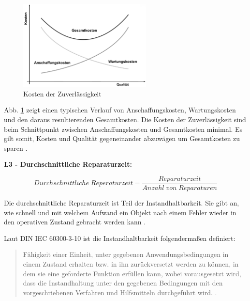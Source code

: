 \begin{figure}[h!]
	\centering
	\includegraphics[width=0.6\textwidth]{BilderAllgemein/kosten_der_zuverlaessigkeit.PNG}
	\caption{Kosten der Zuverlässigkeit \cite{Eberlin14}}
	\label{img:kosten_der_zuverlaessigkeit}
\end{figure}

Abb. \ref{img:kosten_der_zuverlaessigkeit} zeigt einen typischen Verlauf von Anschaffungskosten, Wartungskosten und den daraus resultierenden Gesamtkosten. Die Kosten der Zuverlässigkeit sind beim Schnittpunkt zwischen Anschaffungskosten und Gesamtkosten minimal. Es gilt somit, Kosten und Qualität gegeneinander abzuwägen um Gesamtkosten zu sparen \cite{Eberlin14}.

\textbf{L3 - Durchschnittliche Reparaturzeit:}

$$Durchschnittliche\;Reperaturzeit = \frac{Reparaturzeit}{Anzahl\;von\;Reparaturen}$$

Die durchschnittliche Reparaturzeit ist Teil der Instandhaltbarkeit. Sie gibt an, wie schnell und mit welchem Aufwand ein Objekt nach einem Fehler wieder in den operativen Zustand gebracht werden kann \cite{Maintainability}.

Laut DIN IEC 60300-3-10 ist die Instandhaltbarkeit folgendermaßen definiert:

\begin{quote}
Fähigkeit einer Einheit, unter gegebenen Anwendungsbedingungen in einem Zustand erhalten bzw. in ihn zurückversetzt werden zu können, in dem sie eine geforderte Funktion erfüllen kann, wobei vorausgesetzt wird, dass die Instandhaltung unter den gegebenen Bedingungen mit den vorgeschriebenen Verfahren und Hilfsmitteln durchgeführt wird. \upshape \cite[S. 9]{Din04}.
\end{quote}